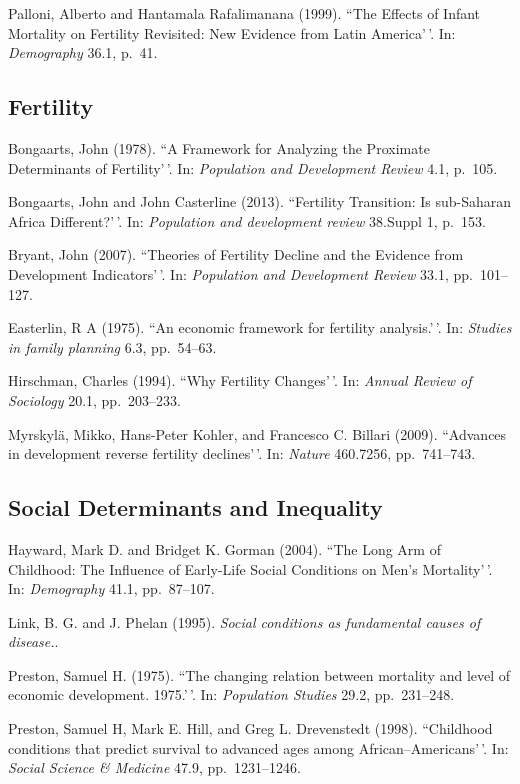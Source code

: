 \documentclass[11pt,]{article}
\begin{document}
Palloni, Alberto and Hantamala Rafalimanana (1999). ``The Effects of
Infant Mortality on Fertility Revisited: New Evidence from Latin
America'\,'. In: \emph{Demography} 36.1, p.~41.

\hypertarget{fertility}{%
\subsection{Fertility}\label{fertility}}

Bongaarts, John (1978). ``A Framework for Analyzing the Proximate
Determinants of Fertility'\,'. In:
\emph{Population and Development Review} 4.1, p.~105.

Bongaarts, John and John Casterline (2013). ``Fertility Transition: Is
sub-Saharan Africa Different?'\,'. In:
\emph{Population and development review} 38.Suppl 1, p.~153.

Bryant, John (2007). ``Theories of Fertility Decline and the Evidence
from Development Indicators'\,'. In:
\emph{Population and Development Review} 33.1, pp.~101--127.

Easterlin, R A (1975). ``An economic framework for fertility
analysis.'\,'. In: \emph{Studies in family planning} 6.3, pp.~54--63.

Hirschman, Charles (1994). ``Why Fertility Changes'\,'. In:
\emph{Annual Review of Sociology} 20.1, pp.~203--233.

Myrskylä, Mikko, Hans-Peter Kohler, and Francesco C. Billari (2009).
``Advances in development reverse fertility declines'\,'. In:
\emph{Nature} 460.7256, pp.~741--743.

\hypertarget{social-determinants-and-inequality}{%
\subsection{Social Determinants and
Inequality}\label{social-determinants-and-inequality}}

Hayward, Mark D. and Bridget K. Gorman (2004). ``The Long Arm of
Childhood: The Influence of Early-Life Social Conditions on Men's
Mortality'\,'. In: \emph{Demography} 41.1, pp.~87--107.

Link, B. G. and J. Phelan (1995).
\emph{Social conditions as fundamental causes of disease.}.

Preston, Samuel H. (1975). ``The changing relation between mortality and
level of economic development. 1975.'\,'. In: \emph{Population Studies}
29.2, pp.~231--248.

Preston, Samuel H, Mark E. Hill, and Greg L. Drevenstedt (1998).
``Childhood conditions that predict survival to advanced ages among
African--Americans'\,'. In: \emph{Social Science \& Medicine} 47.9,
pp.~1231--1246.
\end{document}
